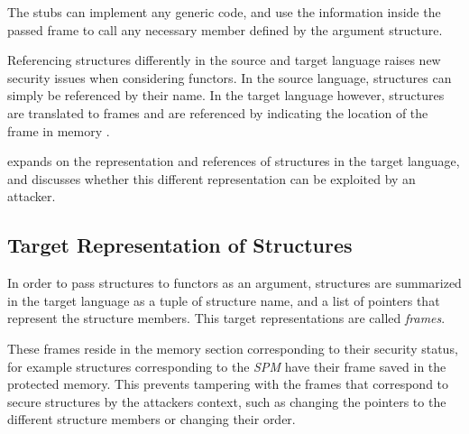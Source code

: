 The stubs can implement any generic code, and use the information inside the passed frame to call any necessary member defined by the argument structure.

\smallskip

Referencing structures differently in the source and target language raises new security issues when considering functors.
In the source language, structures can simply be referenced by their name.
In the target language however, structures are translated to frames and are referenced by indicating the location of the frame in memory .


 expands on the representation and references of structures in the target language, and discusses whether this different representation can be exploited by an attacker.

\subsection{Target Representation of Structures}
\label{sec:LowLevelRepresentation}
In order to pass structures to functors as an argument, structures are summarized in the target language as a tuple of structure name, and a list of pointers that represent the structure members.
This target representations are called \emph{frames}.

These frames reside in the memory section corresponding to their security status, for example
structures corresponding to the \emph{SPM} have their frame saved in the protected memory.
This prevents tampering with the frames that correspond to secure structures by the attackers context, such as changing the pointers to the different structure members or changing their order.


